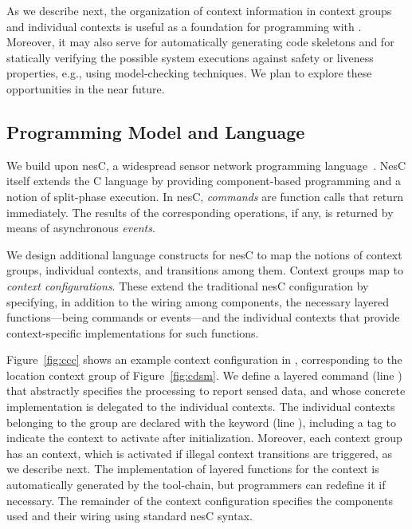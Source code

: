 As we describe next, the organization of context information in
context groups and individual contexts is useful as a foundation for
programming with \conesc. Moreover, it may also serve for
automatically generating code skeletons and for statically verifying
the possible system executions against safety or liveness properties,
e.g., using model-checking techniques. We plan to explore these
opportunities in the near future.

\subsection{Programming Model and Language}

We build upon nesC, a widespread sensor network programming
language~\cite{gay03:nesc}. NesC itself extends the C language by
providing component-based programming and a notion of split-phase
execution. In nesC, \emph{commands} are
function calls that return immediately. The results of the
corresponding operations, if any, is returned by means of asynchronous
\emph{events}.

We design additional language constructs for nesC to map the notions
of context groups, individual contexts, and transitions among
them. Context groups map to \emph{context configurations}. These
extend the traditional nesC configuration by specifying, in addition
to the wiring among components, the necessary layered
functions---being commands or events---and the individual contexts
that provide context-specific implementations for such functions.

Figure~\ref{fig:ccc} shows an example context configuration in
\conesc, corresponding to the location context group of
Figure~\ref{fig:cdsm}. We define a layered {} command
(line ) that abstractly specifies the processing to
report sensed data, and whose concrete implementation is delegated to
the individual contexts. The individual contexts belonging to the
group are declared with the keyword {} (line
), including a tag {} to indicate
the context to activate after initialization. Moreover, each context
group has an {} context, which is activated if illegal
context transitions are triggered, as we describe next. The
implementation of layered functions for the {} context
is automatically generated by the \conesc tool-chain, but programmers can
redefine it if necessary. The remainder of the context configuration
specifies the components used and their wiring using standard nesC
syntax.

